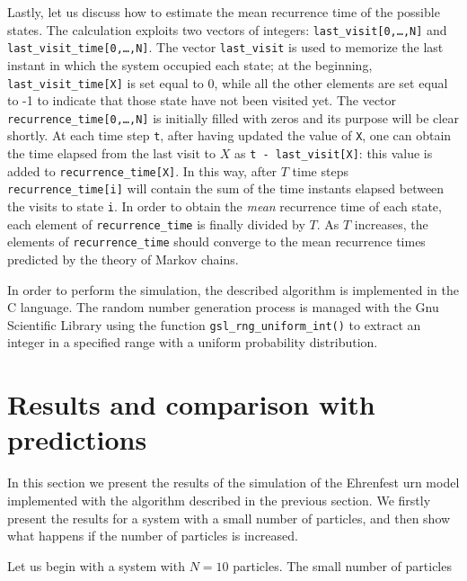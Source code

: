 Lastly, let us discuss how to estimate the mean recurrence time of the possible states. The calculation exploits two vectors of integers: \texttt{last\_visit[0,\dots,N]} and \texttt{last\_visit\_time[0,\dots,N]}. The vector \texttt{last\_visit} is used to memorize the last instant in which the system occupied each state; at the beginning, \texttt{last\_visit\_time[X]} is set equal to 0, while all the other elements are set equal to -1 to indicate that those state have not been visited yet. The vector \texttt{recurrence\_time[0,\dots,N]} is initially filled with zeros and its purpose will be clear shortly. At each time step \texttt{t}, after having updated the value of \texttt{X}, one can obtain the time elapsed from the last visit to $X$ as \texttt{t - last\_visit[X]}: this value is added to \texttt{recurrence\_time[X]}. In this way, after $T$ time steps \texttt{recurrence\_time[i]} will contain the sum of the time instants elapsed between the visits to state \texttt{i}. In order to obtain the \emph{mean} recurrence time of each state, each element of \texttt{recurrence\_time} is finally divided by $T$. As $T$ increases, the elements of \texttt{recurrence\_time} should converge to the mean recurrence times predicted by the theory of Markov chains.

\medskip
In order to perform the simulation, the described algorithm is implemented in the C language. The random number generation process is managed with the Gnu Scientific Library using the function \texttt{gsl\_rng\_uniform\_int()} to extract an integer in a specified range with a uniform probability distribution.

\section{Results and comparison with predictions}
In this section we present the results of the simulation of the Ehrenfest urn model implemented with the algorithm described in the previous section. We firstly present the results for a system with a small number of particles, and then show what happens if the number of particles is increased.

Let us begin with a system with $N = 10$ particles. The small number of particles 





